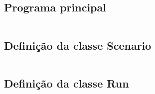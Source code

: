 \documentclass[a4paper, portuguese]{report}
\begin{document}
    \subsection{Programa principal}\label{subsec:programa-principal}
    \inputminted{python}{../src/main.py}

    \subsection{Definição da classe Scenario}\label{subsec:definicao-da-classe-scenario}
    \inputminted{python}{../src/forestfire/scenario.py}

    \subsection{Definição da classe Run}\label{subsec:definicao-da-classe-run}
    \inputminted{python}{../src/forestfire/run.py}

    
    
\end{document}
